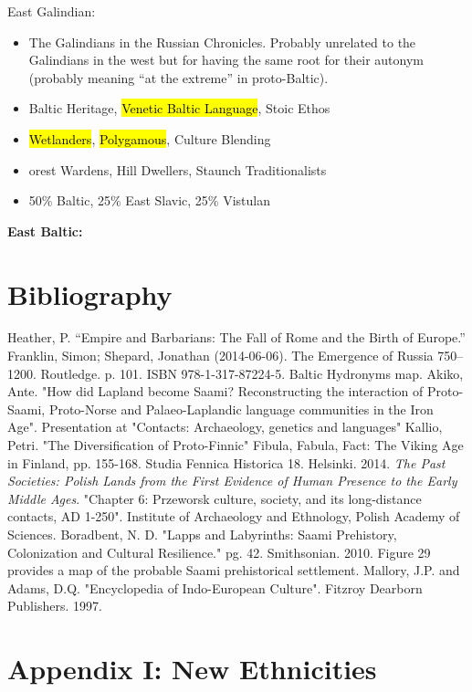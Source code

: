 \documentclass{article}
\begin{document}
	East Galindian:
	\begin{itemize}
		\item The Galindians in the Russian Chronicles. Probably unrelated to the Galindians in the west but for having the same root for their autonym (probably meaning “at the extreme” in proto-Baltic).
		\item Baltic Heritage, \hl{Venetic Baltic Language}, Stoic Ethos
		\item \hl{Wetlanders}, \hl{Polygamous}, Culture Blending
		\item orest Wardens, Hill Dwellers, Staunch Traditionalists
		\item 50\% Baltic, 25\% East Slavic, 25\% Vistulan
	\end{itemize}
	
	\textbf{East Baltic:}
	
	\newpage
	
	\section{Bibliography}
	\label{sec:Bibliography}
	
	\begin{thebibliography}{10}
		Heather, P. “Empire and Barbarians: The Fall of Rome and the Birth of Europe.”
		Franklin, Simon; Shepard, Jonathan (2014-06-06). The Emergence of Russia 750–1200. Routledge. p. 101. ISBN 978-1-317-87224-5.
		Baltic Hydronyms map.
		Akiko, Ante. "How did Lapland become Saami? Reconstructing the interaction of Proto-Saami, Proto-Norse and Palaeo-Laplandic language communities in the Iron Age". Presentation at "Contacts: Archaeology, genetics and languages"
		Kallio, Petri. "The Diversification of Proto-Finnic" Fibula, Fabula, Fact: The Viking Age in Finland, pp. 155-168. Studia Fennica Historica 18. Helsinki. 2014.
		\textit{The Past Societies: Polish Lands from the First Evidence of Human Presence to the Early Middle Ages}. "Chapter 6: Przeworsk culture, society, and its long-distance contacts, AD 1-250". Institute of Archaeology and Ethnology, Polish Academy of Sciences.
		Boradbent, N. D. "Lapps and Labyrinths:  Saami Prehistory, Colonization and Cultural Resilience." pg. 42. Smithsonian. 2010. \tiny Figure 29 provides a map of the probable Saami prehistorical settlement.
		\normalsize
		Mallory, J.P. and Adams, D.Q. "Encyclopedia of Indo-European Culture". Fitzroy Dearborn Publishers. 1997.
	\end{thebibliography}
	
	\newpage
	
	\section{Appendix I: New Ethnicities}
	\label{sec:appendix_new_ethnicities}
	
\end{document}
